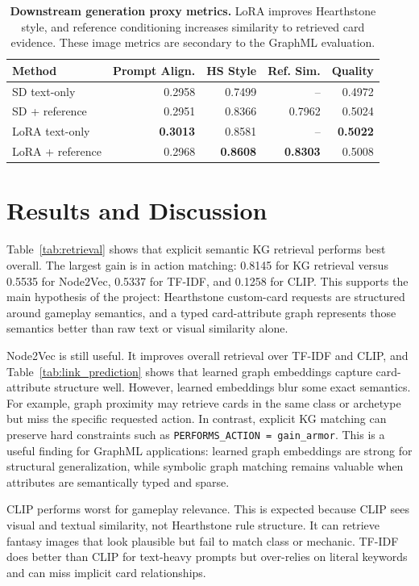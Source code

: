 \documentclass{article}
\begin{document}
\begin{table}[t]
\centering
\small
\begin{tabular}{lrrrr}
\toprule
\textbf{Method} & \textbf{Prompt Align.} & \textbf{HS Style} & \textbf{Ref. Sim.} & \textbf{Quality}\\
\midrule
SD text-only & 0.2958 & 0.7499 & -- & 0.4972\\
SD + reference & 0.2951 & 0.8366 & 0.7962 & 0.5024\\
LoRA text-only & \textbf{0.3013} & 0.8581 & -- & \textbf{0.5022}\\
LoRA + reference & 0.2968 & \textbf{0.8608} & \textbf{0.8303} & 0.5008\\
\bottomrule
\end{tabular}
\caption{\textbf{Downstream generation proxy metrics.} LoRA improves Hearthstone style, and reference conditioning increases similarity to retrieved card evidence. These image metrics are secondary to the GraphML evaluation.}
\label{tab:generation}
\end{table}

\section{Results and Discussion}

Table~\ref{tab:retrieval} shows that explicit semantic KG retrieval performs best overall. The largest gain is in action matching: 0.8145 for KG retrieval versus 0.5535 for Node2Vec, 0.5337 for TF-IDF, and 0.1258 for CLIP. This supports the main hypothesis of the project: Hearthstone custom-card requests are structured around gameplay semantics, and a typed card-attribute graph represents those semantics better than raw text or visual similarity alone.

Node2Vec is still useful. It improves overall retrieval over TF-IDF and CLIP, and Table~\ref{tab:link_prediction} shows that learned graph embeddings capture card-attribute structure well. However, learned embeddings blur some exact semantics. For example, graph proximity may retrieve cards in the same class or archetype but miss the specific requested action. In contrast, explicit KG matching can preserve hard constraints such as \texttt{PERFORMS\_ACTION = gain\_armor}. This is a useful finding for GraphML applications: learned graph embeddings are strong for structural generalization, while symbolic graph matching remains valuable when attributes are semantically typed and sparse.

CLIP performs worst for gameplay relevance. This is expected because CLIP sees visual and textual similarity, not Hearthstone rule structure. It can retrieve fantasy images that look plausible but fail to match class or mechanic. TF-IDF does better than CLIP for text-heavy prompts but over-relies on literal keywords and can miss implicit card relationships.
\end{document}
